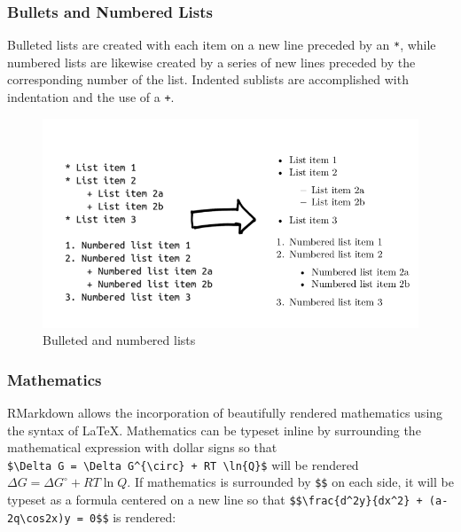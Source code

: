 \documentclass[]{elsarticle} %
\begin{document}
\hypertarget{bullets-and-numbered-lists}{%
\subsubsection{Bullets and Numbered
Lists}\label{bullets-and-numbered-lists}}

Bulleted lists are created with each item on a new line preceded by an
\texttt{*}, while numbered lists are likewise created by a series of new
lines preceded by the corresponding number of the list. Indented
sublists are accomplished with indentation and the use of a \texttt{+}.

\begin{figure}[H]

{\centering \includegraphics[width=0.9\linewidth,]{Figure3} 

}

\caption{Bulleted and numbered lists}\label{fig:fig3}
\end{figure}

\hypertarget{mathematics}{%
\subsubsection{Mathematics}\label{mathematics}}

RMarkdown allows the incorporation of beautifully rendered mathematics
using the syntax of LaTeX. Mathematics can be typeset inline by
surrounding the mathematical expression with dollar signs so that
\texttt{\$\textbackslash{}Delta\ G\ =\ \textbackslash{}Delta\ G\^{}\{\textbackslash{}circ\}\ +\ RT\ \textbackslash{}ln\{Q\}\$}
will be rendered \(\Delta G = \Delta G^{\circ} + RT \ln{Q}\). If
mathematics is surrounded by \texttt{\$\$} on each side, it will be
typeset as a formula centered on a new line so that
\texttt{\$\$\textbackslash{}frac\{d\^{}2y\}\{dx\^{}2\}\ +\ (a-2q\textbackslash{}cos2x)y\ =\ 0\$\$}
is rendered:
\end{document}
